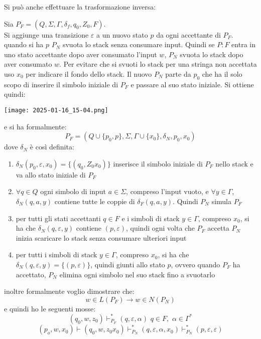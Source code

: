 	Si può anche effettuare la trasformazione inversa:
	\begin{theorem}
		Sia $P_F=(Q,\Sigma,\Gamma,\delta_f,q_0,Z_0,F)$.\\
		Si aggiunge una transizione $\varepsilon$  a un nuovo stato $p$ da ogni accettante di $P_F$. quando si ha $p$ $P_N$ svuota lo stack senza consumare input. Quindi se $P:F$ entra in uno stato accettante dopo aver consumato l'input $w$, $P_N$ svuota lo stack dopo aver consumato $w$. Per evitare che si svuoti lo stack per una stringa non accettata uso $x_0$ per indicare il fondo dello stack. Il nuovo $P_N$ parte da $p_0$ che ha il solo scopo di inserire il simbolo iniziale di $P_F$ e passare al suo stato iniziale. Si ottiene quindi:
		\begin{center}
		\texttt{[image: 2025-01-16\_15-04.png]}
		\end{center}
		e si ha formalmente:
		$$P_F=(Q\cup\{p_0,p\}, \Sigma,\Gamma\cup\{x_0\},\delta_N,p_0,x_0)$$
		dove $\delta_N$ è così definita:
		\begin{enumerate}
			\item $\delta_N(p_0,\varepsilon,x_0)=\{(q_0,Z_0x_0)\}$ inserisce il simbolo iniziale di $P_F$ nello stack e va allo stato iniziale di $P_F$
			\item $\forall q\in Q$ ogni simbolo di input $a\in\Sigma$, compreso l'input vuoto, e $\forall y\in \Gamma$, $\delta_N(q,a,y)$  contiene tutte le coppie di $\delta_F(q,a,y)$. Quindi $P_N$ simula $P_F$
			\item per tutti gli stati accettanti $q\in F$ e i simboli di stack $y\in\Gamma$, compreso $x_0$, si ha che $\delta_N(q,\varepsilon,y)$ contiene $(p,\varepsilon)$, quindi ogni volta che $P_F$ accetta $P_N$ inizia scaricare lo stack senza consumare ulteriori input
			\item per tutti  i simboli di stack $y\in\Gamma$, compreso $x_0$, si ha che $\delta_N(q,\varepsilon,y)=\{(p,\varepsilon)\}$, quindi giunti allo stato $p$, ovvero quando $P_F$ ha accettato, $P_N$ elimina ogni simbolo nel suo stack fino a svuotarlo
		\end{enumerate}
		inoltre formalmente voglio dimostrare che:
		$$w\in L(P_F)\to w\in N(P_N)$$
		e quindi ho le seguenti mosse:
		$$(q_0,w,z_0)\vdash_{P_F}^*(q,\varepsilon,\alpha)\,\,q\in F,\,\,\alpha\in\Gamma^*$$
		$$(p_o,w,x_0)\vdash(q_0,w,z_0x_0)\vdash_{P_N}^*(q,\varepsilon,\alpha,x_0)\vdash_{P_N}^*(p,\varepsilon,\varepsilon)$$
	\end{theorem}
